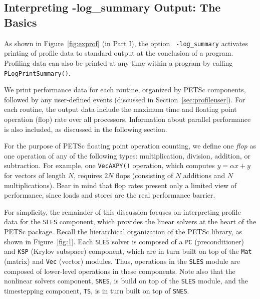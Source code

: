 \subsection{Interpreting -log\_summary Output: The Basics}

As shown in Figure~\ref{fig:exprof} (in Part I), the option {\tt
-log\_summary}  activates printing of profile
data to standard output at the conclusion of a program.  Profiling
data can also be printed at any time within a program by calling {\tt
PLogPrintSummary()}.

We print performance data for each routine, organized by PETSc
components, followed by any user-defined events (discussed in
Section~\ref{sec:profileuser}).  For each routine, the output data
include the maximum time and floating point operation (flop) rate over
all processors.  Information about parallel performance is also
included, as discussed in the following section.

For the purpose of PETSc floating point operation counting, we define
one {\em flop} as one operation of any of the following types:
multiplication, division, addition, or subtraction.  For example, one
{\tt VecAXPY()} operation, which computes $y = \alpha x + y$ for
vectors of length $N$, requires $2N$ flops (consisting of $N$
additions and $N$ multiplications).  Bear in mind that flop rates
present only a limited view of performance, since loads and stores are
the real performance barrier.

For simplicity, the remainder of this discussion focuses on
interpreting profile data for the {\tt SLES} component, 
which provides the linear solvers at the heart of the
PETSc package.  Recall the hierarchical organization of the PETSc
library, as shown in Figure~\ref{fig:1}.  Each {\tt SLES} solver 
is composed of a {\tt PC} (preconditioner) and {\tt KSP} (Krylov
subspace) component, which are in turn built on top of the {\tt Mat} 
(matrix) and {\tt Vec} (vector) modules.  Thus, operations in the
{\tt SLES} module are composed of lower-level operations in these
components.  Note also that the nonlinear solvers component, {\tt SNES}, 
is build on top of the {\tt SLES} module, and the timestepping
component, {\tt TS}, is in turn built on top of {\tt SNES}.

